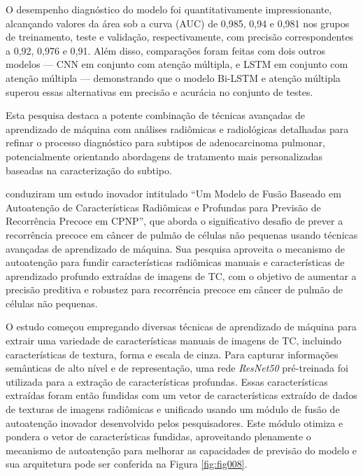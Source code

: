 O desempenho diagnóstico do modelo foi quantitativamente impressionante, alcançando valores da área sob a curva (AUC) de 0,985, 0,94 e 0,981 nos grupos de treinamento, teste e validação, respectivamente, com precisão correspondentes a 0,92, 0,976 e 0,91. Além disso, comparações foram feitas com dois outros modelos — \gls{CNN} em conjunto com atenção múltipla, e LSTM em conjunto com atenção múltipla — demonstrando que o modelo Bi-LSTM e atenção múltipla superou essas alternativas em precisão e acurácia no conjunto de testes.

Esta pesquisa destaca a potente combinação de técnicas avançadas de aprendizado de máquina com análises radiômicas e radiológicas detalhadas para refinar o processo diagnóstico para subtipos de adenocarcinoma pulmonar, potencialmente orientando abordagens de tratamento mais personalizadas baseadas na caracterização do subtipo.

  conduziram um estudo inovador intitulado ``Um Modelo de Fusão Baseado em Autoatenção de Características Radiômicas e Profundas para Previsão de Recorrência Precoce em CPNP'', que aborda o significativo desafio de prever a recorrência precoce em câncer de pulmão de células não pequenas usando técnicas avançadas de aprendizado de máquina. Sua pesquisa aproveita o mecanismo de autoatenção para fundir características radiômicas manuais e características de aprendizado profundo extraídas de imagens de \gls{TC}, com o objetivo de aumentar a precisão preditiva e robustez para recorrência precoce em câncer de pulmão de células não pequenas.

O estudo começou empregando diversas técnicas de aprendizado de máquina para extrair uma variedade de características manuais de imagens de \gls{TC}, incluindo características de textura, forma e escala de cinza. Para capturar informações semânticas de alto nível e de representação, uma rede \textit{ResNet50} pré-treinada foi utilizada para a extração de características profundas. Essas características extraídas foram então fundidas com um vetor de características extraído de dados de texturas de imagens radiômicas e unificado usando um módulo de fusão de autoatenção inovador desenvolvido pelos pesquisadores. Este módulo otimiza e pondera o vetor de características fundidas, aproveitando plenamente o mecanismo de autoatenção para melhorar as capacidades de previsão do modelo e sua arquitetura pode ser conferida na Figura \ref{fig:fig008}.

